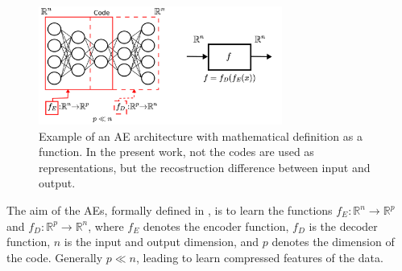 \documentclass[journal,article,submit,pdftex,moreauthors]{Definitions/mdpi}
\begin{document}

\begin{figure}[H]
	\centering
	\includegraphics[width=8cm]{figures/autoencoder_methodology.pdf}
	 \caption{Example of an AE architecture with mathematical definition as a function. In the present work, not the codes are used as representations, but the recostruction difference between input and output.}
	\label{AEs_example}      
	\centering
\end{figure}

The aim of the AEs, formally defined in \cite{Baldi2012}, is to learn  the functions $f_{E}: \mathbb{R}^{n} \to \mathbb{R}^{p} $ and $f_{D}: \mathbb{R}^{p} \to \mathbb{R}^{n}$, where $f_{E}$ denotes the encoder function, $f_{D}$ is the decoder function, $n$ is the input and output dimension, and $p$ denotes the dimension of the code.
Generally $p \ll n$, leading to learn compressed features of the data. 
\end{document}
